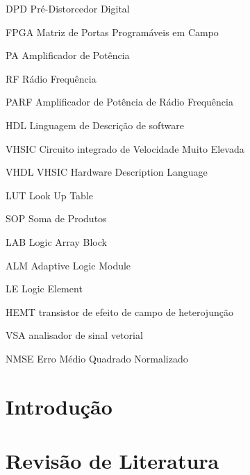 \documentclass[
	12pt,				%
	openright,			%
	oneside,			%
	a4paper,			%
	brazil				%
	]{abntex2}
\begin{document}
\begin{siglas}  %
 \item[DPD]  Pré-Distorcedor Digital
 \item[FPGA] Matriz de Portas Programáveis em Campo 
 \item[PA] Amplificador de Potência
 \item[RF] Rádio Frequência 
 \item[PARF] Amplificador de Potência de Rádio Frequência 
 \item[HDL] Linguagem de Descrição de software
 \item[VHSIC]  Circuito integrado de Velocidade Muito Elevada 
 \item[VHDL]  VHSIC Hardware Description Language
 \item[LUT]  Look Up Table
 \item[SOP]  Soma de Produtos 
 \item[LAB]  Logic Array Block 
 \item[ALM]  Adaptive Logic Module
 \item[LE]   Logic Element 
 \item[HEMT] transistor de efeito de campo de heterojunção
 \item[VSA] analisador de sinal vetorial  
 \item[NMSE] Erro Médio Quadrado Normalizado
\end{siglas}

\listoffigures*
\cleardoublepage
\tableofcontents*
\cleardoublepage



\textual

\setcounter{page}{1}

\chapter{Introdução} 
\label{chap:introducao}


\chapter{Revisão de Literatura} 
\label{chap:revi}

\end{document}
